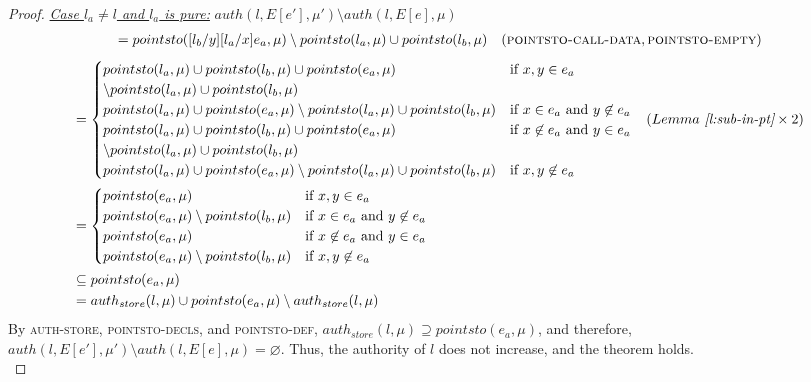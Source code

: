 \documentclass{llncs}
\begin{document}
\begin{proof}
\noindent\underline{\textit{Case $l_a \neq l$ and $l_a$ is pure:}}
$auth(l, E[e'], \mu') \setminus auth(l, E[e], \mu)$
\vspace{-7pt}
\begin{align*}
&= pointsto([l_b / y][l_a / x]e_a, \mu) \setminus pointsto(l_a, \mu) \cup pointsto(l_b, \mu) & (\textsc{pointsto-call-data}, \textsc{pointsto-empty})
\end{align*}
\vspace{-25pt}
\begin{align*}
&=
\begin{cases}
    pointsto(l_a, \mu) \cup pointsto(l_b, \mu) \cup pointsto(e_a, \mu) & \text{if } x, y \in e_a\\
    \setminus pointsto(l_a, \mu) \cup pointsto(l_b, \mu)\\
    pointsto(l_a, \mu) \cup pointsto(e_a, \mu) \setminus pointsto(l_a, \mu) \cup pointsto(l_b, \mu) & \text{if } x \in e_a\text{ and } y \not\in e_a\\
    pointsto(l_a, \mu) \cup pointsto(l_b, \mu) \cup pointsto(e_a, \mu) & \text{if } x \not\in e_a \text{ and } y \in e_a\\
    \setminus pointsto(l_a, \mu) \cup pointsto(l_b, \mu)\\
    pointsto(l_a, \mu) \cup pointsto(e_a, \mu) \setminus pointsto(l_a, \mu) \cup pointsto(l_b, \mu) & \text{if } x, y \not\in e_a
\end{cases} & (Lemma~\textit{\ref{l:sub-in-pt}} \times 2)\\
&=
\begin{cases}
    pointsto(e_a, \mu) & \text{if } x, y \in e_a\\
    pointsto(e_a, \mu) \setminus pointsto(l_b, \mu) & \text{if } x \in e_a\text{ and } y \not\in e_a\\
    pointsto(e_a, \mu) & \text{if } x \not\in e_a \text{ and } y \in e_a\\
    pointsto(e_a, \mu) \setminus pointsto(l_b, \mu) &\text{if } x, y \not\in e_a
\end{cases}\\
&\subseteq pointsto(e_a, \mu)\\
&= auth_{store}(l, \mu) \cup pointsto(e_a, \mu) \setminus auth_{store}(l, \mu)
\end{align*}
By \textsc{auth-store}, \textsc{pointsto-decls}, and \textsc{pointsto-def}, $auth_{store}(l, \mu) \supseteq pointsto(e_a, \mu)$, and therefore, $auth(l, E[e'], \mu') \setminus auth(l, E[e], \mu) = \varnothing$. Thus, the authority of $l$ does not increase, and the theorem holds.\\



\end{proof}
\end{document}
